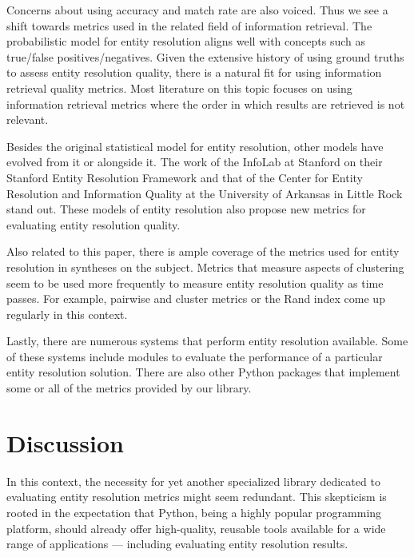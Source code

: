 \documentclass[11pt]{article}
\begin{document}
    Concerns about using accuracy and match rate are also voiced\cite{Goga2015}.
    Thus we see a shift towards metrics used in the related field of information
    retrieval.
    The probabilistic model for entity resolution aligns well with concepts such
    as true/false positives/negatives.
    Given the extensive history of using ground truths to assess entity
    resolution quality, there is a natural fit for using information retrieval
    quality metrics.
    Most literature on this topic focuses on using information retrieval metrics
    where the order in which results are retrieved is not
    relevant\cite{manning2008}.

    Besides the original statistical model for entity resolution, other models
    have evolved from it or alongside it.
    The work of the InfoLab at Stanford on their Stanford Entity Resolution
    Framework\cite{Ben2009Swoosh} and that of the Center for Entity Resolution
    and Information Quality at the University of Arkansas in Little
    Rock\cite{tal2007algebraic} stand out.
    These models of entity resolution also propose new metrics for evaluating
    entity resolution quality\cite{Men10,Tal11}.

    Also related to this paper, there is ample coverage of the metrics used for
    entity resolution in syntheses on the subject\cite{vldb2010,hitesh2012,Tal11}.
    Metrics that measure aspects of clustering seem to be used more frequently
    to measure entity resolution quality as time passes.
    For example, pairwise and cluster metrics\cite{Men10, huang2006efficient} or
    the Rand index\cite{tal2007algebraic} come up regularly in this context.

    Lastly, there are numerous systems that perform entity resolution available.
    Some of these systems include modules to evaluate the performance of a
    particular entity resolution solution\cite{fever2009,magellan2020,oyster2012}.
    There are also other Python packages that implement some or all of the
    metrics provided by our library\cite{nmeth2020scipy,ereval}.

    \section{Discussion}\label{sec:discussion}

    In this context, the necessity for yet another specialized library dedicated
    to evaluating entity resolution metrics might seem redundant.
    This skepticism is rooted in the expectation that Python, being a highly
    popular programming platform, should already offer high-quality, reusable
    tools available for a wide range of applications --- including evaluating
    entity resolution results.
    
\end{document}

